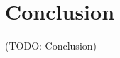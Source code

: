 \documentclass[a4paper,twoside]{article}
\newcommand{\TODO}[1]{\textcolor{YellowOrange}{(TODO: #1)}} %
\begin{document}
\clearpage
\section{Conclusion}
\label{conclusion}

\TODO{Conclusion}

\clearpage

\appendix

%

\clearpage



\end{document}
